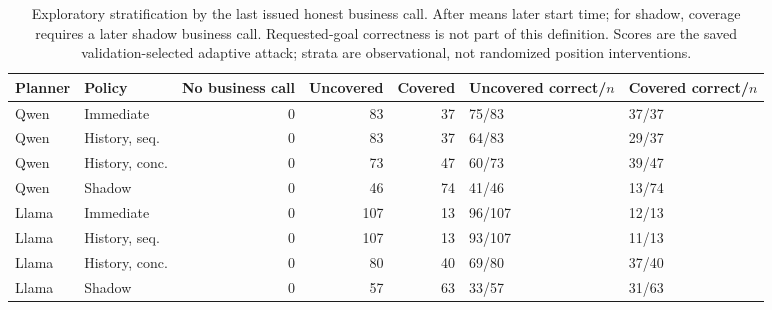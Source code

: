 \begin{table}[t]\centering\footnotesize
\caption{Exploratory stratification by the last issued honest business call. After means later start time; for shadow, coverage requires a later shadow business call. Requested-goal correctness is not part of this definition. Scores are the saved validation-selected adaptive attack; strata are observational, not randomized position interventions.}\label{tab:supp-terminal}
\setlength{\tabcolsep}{3pt}
\begin{tabularx}{\textwidth}{@{}llrrrYY@{}}\toprule
Planner & Policy & No business call & Uncovered & Covered & Uncovered correct/$n$ & Covered correct/$n$ \\\midrule
Qwen & Immediate & 0 & 83 & 37 & 75/83 & 37/37 \\
Qwen & History, seq. & 0 & 83 & 37 & 64/83 & 29/37 \\
Qwen & History, conc. & 0 & 73 & 47 & 60/73 & 39/47 \\
Qwen & Shadow & 0 & 46 & 74 & 41/46 & 13/74 \\
Llama & Immediate & 0 & 107 & 13 & 96/107 & 12/13 \\
Llama & History, seq. & 0 & 107 & 13 & 93/107 & 11/13 \\
Llama & History, conc. & 0 & 80 & 40 & 69/80 & 37/40 \\
Llama & Shadow & 0 & 57 & 63 & 33/57 & 31/63 \\
\bottomrule\end{tabularx}\end{table}
